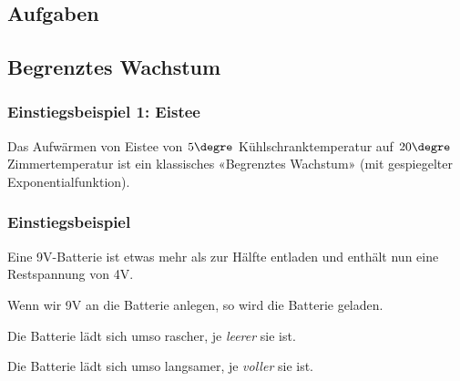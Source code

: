 \subsection*{Aufgaben}



\newpage



\subsection{Begrenztes Wachstum}
\subsubsection{Einstiegsbeispiel 1: Eistee}
Das Aufwärmen von Eistee von $5\degre$ Kühlschranktemperatur auf $20\degre$ Zimmertemperatur ist ein klassisches «Begrenztes Wachstum» (mit gespiegelter Exponentialfunktion).


\subsubsection{Einstiegsbeispiel}
\begin{center}
\end{center}

Eine 9V-Batterie ist etwas mehr als zur Hälfte entladen und enthält nun eine
Restspannung von 4V.

Wenn wir 9V an die Batterie anlegen, so wird die Batterie geladen.

Die Batterie lädt sich umso rascher, je \textit{leerer} sie ist.

Die Batterie lädt sich umso langsamer, je \textit{voller} sie ist.


\newpage

